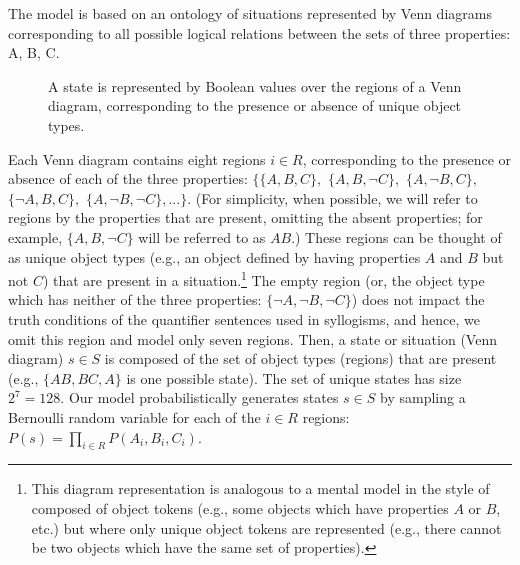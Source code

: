 \documentclass[floatsintext, doc]{apa6}
\begin{document}
The model is based on an ontology of situations represented by Venn diagrams corresponding to all possible logical relations between the sets of three properties: A, B, C. 

\begin{figure}[h]
\centering
{}
\label{fig:venn}
\caption{A state is represented by Boolean values over the regions of a Venn diagram, corresponding to the presence or absence of unique object types.}
\end{figure}

Each Venn diagram contains eight regions $i \in R$, corresponding to the presence or absence of each of the three properties: $\{\{A,B,C\},$ $\{A,B,\neg C\},$ $\{A,\neg B,C\},$ $\{\neg A, B, C\},$ $\{A, \neg B, \neg C\},...\}$. (For simplicity, when possible, we will refer to regions by the properties that are present, omitting the absent properties; for example, $\{A, B, \neg C\}$ will be referred to as $AB$.)
These regions can be thought of as unique object types (e.g., an object defined by having properties $A$ and $B$ but not $C$) that are present in a situation.\footnote{This diagram representation is analogous to a mental model in the style of  composed of object tokens (e.g., some objects which have properties $A$ or $B$, etc.) but where only unique object tokens are represented (e.g., there cannot be two objects which have the same set of properties).}
The empty region (or, the object type which has neither of the three properties: $\{\neg A, \neg B, \neg C\}$) does not impact the truth conditions of the quantifier sentences used in syllogisms, and hence, we omit this region and model only seven regions.
Then, a state or situation (Venn diagram) $s \in S$ is composed of the set of object types (regions) that are present (e.g., $\{AB, BC, A\}$ is one possible state).
The set of unique states has size $2^7 = 128$.
Our model probabilistically generates states $s \in S$ by sampling a Bernoulli random variable for each of the $i \in R$ regions: $P(s) = \prod_{i \in R} P(A_{i}, B_{i}, C_{i})$. %
\end{document}
